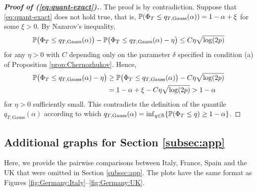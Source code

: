 \documentclass[a4paper,12pt]{article}
\numberwithin{equation}{section}
\begin{document}
\begin{proof}[\textnormal{\textbf{Proof of (\ref{eq:quant-exact}).}}]
The proof is by contradiction. Suppose that \eqref{eq:quant-exact} does not hold true, that is, $\mathbb{P}(\Phi_T \le q_{T,\text{Gauss}}(\alpha)) = 1-\alpha + \xi$ for some $\xi > 0$. By Nazarov's inequality, 
\begin{equation*}
\mathbb{P} \big(\Phi_T \le q_{T,\text{Gauss}}(\alpha)\big) - \mathbb{P}\big(\Phi_T \le q_{T,\text{Gauss}}(\alpha) - \eta\big) \le C \eta \sqrt{\log (2p)} 
\end{equation*}
for any $\eta > 0$ with $C$ depending only on the parameter $\delta$ specified in condition (a) of Proposition \ref{prop:Chernozhukov}. Hence, 
\begin{align*}
\mathbb{P} \big(\Phi_T \le q_{T,\text{Gauss}}(\alpha) - \eta\big) 
 & \ge \mathbb{P}\big(\Phi_T \le q_{T,\text{Gauss}}(\alpha) \big) - C \eta \sqrt{\log(2p)} \\
 & = 1-\alpha + \xi - C \eta \sqrt{\log(2p)} > 1-\alpha
\end{align*}
for $\eta > 0$ sufficiently small. This contradicts the definition of the quantile $q_{T,\text{Gauss}}(\alpha)$ according to which $q_{T,\text{Gauss}}(\alpha) = \inf_{q \in \mathbb{R}} \{ \mathbb{P}(\Phi_T \le q) \ge 1-\alpha \}$. 
\end{proof}



\newpage
\subsection{Additional graphs for Section \ref{subsec:app}}\label{s:subsec:app}


Here, we provide the pairwise comparisons between Italy, France, Spain and the UK that were omitted in Section \ref{subsec:app}. The plots have the same format as Figures \ref{fig:Germany:Italy}--\ref{fig:Germany:UK}. 
\end{document}
